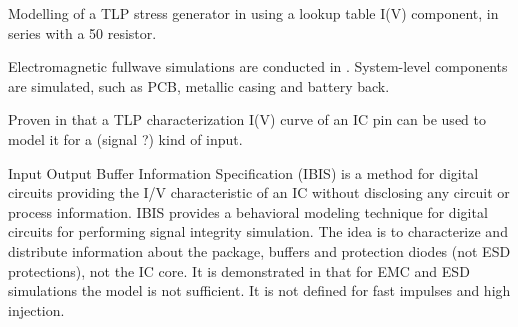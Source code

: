 %
Modelling of a TLP stress generator in \cite{LacrampeTransientImmunity} using a lookup table I(V) component, in series with a 50\textOmega{} resistor.

Electromagnetic fullwave simulations are conducted in \cite{softFailMobile}.
System-level components are simulated, such as PCB, metallic casing and battery back.

Proven in \cite{usb2ESDProtection} that a TLP characterization I(V) curve of an IC pin can be used to model it for a (signal ?) kind of input.

Input Output Buffer Information Specification (IBIS) \cite{ibis-spec} is a method for digital circuits providing the I/V characteristic of an IC without disclosing any circuit or process information.
IBIS provides a behavioral modeling technique for digital circuits for performing signal integrity simulation.
The idea is to characterize and distribute information about the package, buffers and protection diodes (not ESD protections), not the IC core.
It is demonstrated in \cite{ibisImprovementFabrice} that for EMC and ESD simulations the model is not sufficient.
It is not defined for fast impulses and high injection.
